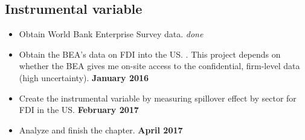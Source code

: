 \subsection{Instrumental variable}
\begin{itemize}
\item Obtain World Bank Enterprise Survey data. \textit{done}
\item Obtain the BEA's data on FDI into the US. . This project depends on whether the BEA gives me on-site access to the confidential, firm-level data (high uncertainty). \textbf{January 2016}
\item Create the instrumental variable by measuring spillover effect by sector for FDI in the US. \textbf{February 2017}
\item Analyze and finish the chapter. \textbf{April 2017}
\end{itemize}